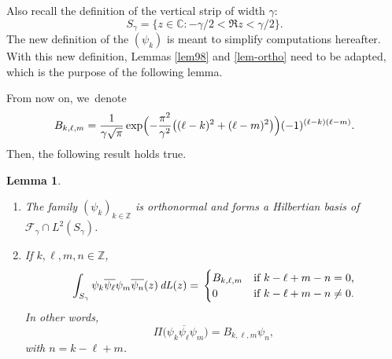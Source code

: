 \documentclass[JEP,XML,SOM,Unicode,NoFloatCountersInSection,published]{cedram}
\let\sep:
\DeclareMathOperator{\dL}{\mathit{dL}}
\newtheorem{lemme}[theorem]{Lemma}
\theoremstyle{definition}
\let\EE\exp
\let\ov\overline
\newcommand\Z{\mathbb Z}
\begin{document}
Also recall the definition of the vertical strip of width $\gamma$:
\[
S_{\gamma} = \bigl\{z \in \mathbb{C}\sep -{\gamma}/{2} < \Re z <{\gamma}/{2} \bigr\}.
\]
The new definition of the $(\psi_k)$ is meant to simplify computations hereafter. With this new definition, Lemmas \ref{lem98} and \ref{lem-ortho} need to be adapted, which is the purpose of the following lemma.

From now on, we~denote
\begin{equation}\label{def-B}
B_{k,\ell,m} = \frac{1}{\gamma\sqrt{\pi}}\EE\Bigl(-\frac{\pi^2}{\gamma^2}\bigl((\ell-k)^2+(\ell-m)^2\bigr)\Bigr)(-1)^{(\ell-k)(\ell-m)}.
\end{equation}
Then, the following result holds true.

\skpt
\begin{lemme}\label{lem-ortho-hexa}
\begin{enumerate}
\item\label{lem-ortho-hexai} The family $(\psi_k)_{k \in \Z}$ is orthonormal and forms a Hilbertian basis of $\mathcal{F}_{\gamma} \cap L^{2}(S_{ \gamma})$.
\item\label{lem-ortho-hexaii} If $k,\ell,m, n \in \mathbb{Z}$,
\begin{equation*}
\int_{S_{\gamma}} \psi_{k}\ov{\psi_{\ell}} \psi_{m}\ov{\psi_{n}}(z) \dL(z) =\\
\begin{cases}
B_{k,\ell,m} & \text{if $k - \ell + m - n = 0$,} \\
0 & \text{if $k - \ell + m - n \neq 0$}.
\end{cases}
\end{equation*}
In other words,
\begin{equation}\label{proj4}
\Pi\bigl(\psi_{k}\ov{\psi_{\ell}} \psi_{m}\bigr)=B_{k,\ell,m} \psi_{n},
\end{equation}
with $n = k - \ell + m$.
\end{enumerate}
\end{lemme}
\end{document}
